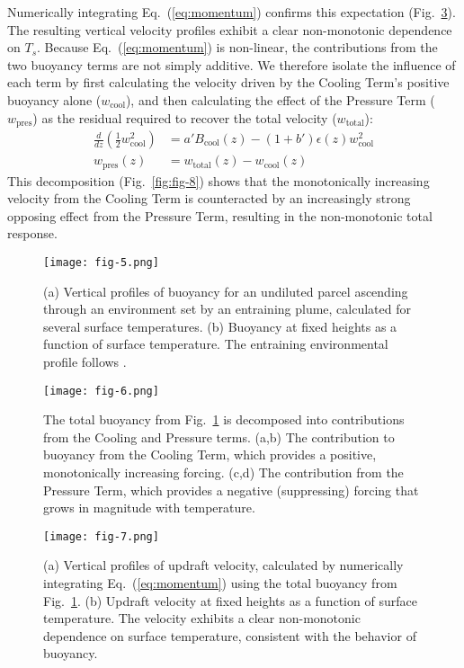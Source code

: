\documentclass[draft]{ametsocV6.1}
\begin{document}
Numerically integrating Eq.~(\ref{eq:momentum}) confirms this expectation (Fig.~\ref{fig:fig-7}). The resulting vertical velocity profiles exhibit a clear non-monotonic dependence on $T_s$. Because Eq.~(\ref{eq:momentum}) is non-linear, the contributions from the two buoyancy terms are not simply additive. We therefore isolate the influence of each term by first calculating the velocity driven by the Cooling Term's positive buoyancy alone ($w_{\text{cool}}$), and then calculating the effect of the Pressure Term ($w_{\text{pres}}$) as the residual required to recover the total velocity ($w_{\text{total}}$):
\begin{align}
\frac{d}{dz}\left(\frac{1}{2}w_{\text{cool}}^2\right)&=a'B_{\text{cool}}(z)-(1+b')\epsilon(z)w_{\text{cool}}^2 \label{eq:w_cool} \\
w_{\text{pres}}(z)&=w_{\text{total}}(z)-w_{\text{cool}}(z) \label{eq:w_pres}
\end{align}
This decomposition (Fig.~\ref{fig:fig-8}) shows that the monotonically increasing velocity from the Cooling Term is counteracted by an increasingly strong opposing effect from the Pressure Term, resulting in the non-monotonic total response.

\begin{figure}[htbp]
 \centering
 \texttt{[image: fig-5.png]}\\
 \caption{(a) Vertical profiles of buoyancy for an undiluted parcel ascending through an environment set by an entraining plume, calculated for several surface temperatures. (b) Buoyancy at fixed heights as a function of surface temperature. The entraining environmental profile follows \cite{romps2016}.}\label{fig:fig-5}
\end{figure}

\begin{figure}[htbp]
 \centering
 \texttt{[image: fig-6.png]}\\
 \caption{The total buoyancy from Fig.~\ref{fig:fig-5} is decomposed into contributions from the Cooling and Pressure terms. (a,b) The contribution to buoyancy from the Cooling Term, which provides a positive, monotonically increasing forcing. (c,d) The contribution from the Pressure Term, which provides a negative (suppressing) forcing that grows in magnitude with temperature.}\label{fig:fig-6}
\end{figure}

\begin{figure}[htbp]
 \centering
 \texttt{[image: fig-7.png]}\\
 \caption{(a) Vertical profiles of updraft velocity, calculated by numerically integrating Eq.~(\ref{eq:momentum}) using the total buoyancy from Fig.~\ref{fig:fig-5}. (b) Updraft velocity at fixed heights as a function of surface temperature. The velocity exhibits a clear non-monotonic dependence on surface temperature, consistent with the behavior of buoyancy.}\label{fig:fig-7}
\end{figure}
\end{document}
